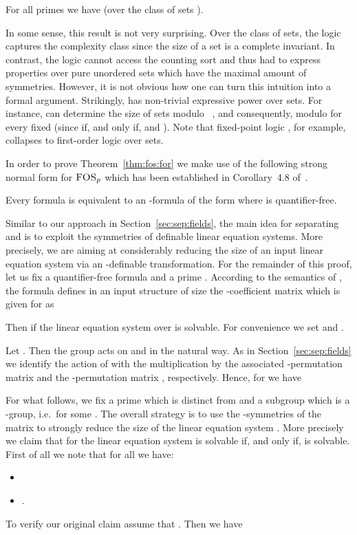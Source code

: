 \documentclass[a4paper,UKenglish]{lipics}
\newcommand{\logic}[1]{\ensuremath{\textsc{#1}}\xspace}
\newcommand{\FOSp}{\ensuremath{\logic{FOS}_p}\xspace}
\theoremstyle{plain}
\begin{document}
\begin{theorem}
\label{thm:fos:for}
 For all primes  we have  (over the class of sets 
).
\end{theorem}

In some sense, this result is not very surprising. 
Over the class of sets, the logic  captures the complexity class 
 since the size of a set is a complete invariant.
In contrast, the logic  cannot access the counting sort 
and thus had to express properties over pure unordered sets which have 
the maximal amount of symmetries.
However, it is not obvious how one can turn this intuition into a formal 
argument. Strikingly,  has non-trivial expressive 
power over sets. For instance,  can determine the 
size of sets modulo ~\cite{Pa10}, and consequently, modulo  for 
every fixed  (since  if, and only if, 
 and ). 
Note that fixed-point logic , for example, collapses to 
first-order logic over sets.

In order to prove Theorem~\ref{thm:fos:for} we make use of the following 
strong normal form for \FOSp which has been established 
in Corollary~4.8 of~\cite{DaGrHoKoPa13}.
\begin{theorem}
\label{thm:normalform:fos}
Every formula  is equivalent to an 
-formula of
the form  where 
 is quantifier-free.
\end{theorem}


\medskip
Similar to our approach in Section~\ref{sec:sep:fields}, the main idea 
for separating  and  is to exploit the symmetries of definable 
linear equation systems.
More precisely, we are aiming at considerably reducing the size of an input 
linear equation system via an -definable transformation. For the 
remainder of this proof, let us fix a quantifier-free formula 
 and a 
prime . 
According to the semantics of , the formula  defines in an
input structure  of size  the -coefficient
matrix  which is given for  as

Then  if the linear
equation system   over  is solvable.
For convenience we set  and . 

Let . Then the group  acts on 
and  in the natural way. 
As in Section~\ref{sec:sep:fields} we identify the action of  with the multiplication by the associated -permutation matrix  and the -permutation 
matrix , respectively. Hence, for  we have 


For what follows, we fix a prime  which is distinct from  
and a subgroup  which is a -group, i.e.\  for some . The overall strategy is to use the -symmetries of the 
matrix 
to strongly reduce the size of the linear equation system .
More precisely we claim that for  the
linear equation system  is solvable if, and only if,
 is solvable. First of all we note that for all
 we have:
\begin{itemize}
 \item 
 \item .
\end{itemize}
To verify our original claim assume that . Then we have
\end{document}
